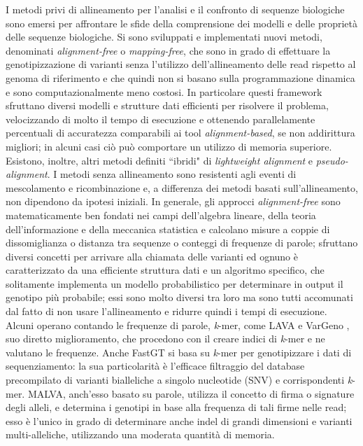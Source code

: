 \documentclass[../main.tex]{subfiles}
\begin{document}
\noindent
I metodi privi di allineamento per l'analisi e il confronto di sequenze biologiche sono emersi per affrontare le sfide della comprensione dei modelli e delle proprietà delle sequenze biologiche. Si sono sviluppati e implementati nuovi metodi, denominati \textit{alignment-free} o \textit{mapping-free}, che sono in grado di effettuare la genotipizzazione di varianti senza l'utilizzo dell'allineamento delle read rispetto al genoma di riferimento e che quindi non si basano sulla programmazione dinamica e sono computazionalmente meno costosi. In particolare questi framework sfruttano diversi modelli e strutture dati efficienti per risolvere il problema, velocizzando di molto il tempo di esecuzione e ottenendo parallelamente percentuali di accuratezza comparabili ai tool \textit{alignment-based}, se non addirittura migliori; in alcuni casi ciò può comportare un utilizzo di memoria superiore. Esistono, inoltre, altri metodi definiti ``ibridi" di \textit{lightweight alignment} e \textit{pseudo-alignment}. 
I metodi senza allineamento sono resistenti agli eventi di mescolamento e ricombinazione e, a differenza dei metodi basati sull'allineamento, non dipendono da ipotesi iniziali. In generale, gli approcci \textit{alignment-free} sono matematicamente ben fondati nei campi dell'algebra lineare, della teoria dell'informazione e della meccanica statistica e calcolano misure a coppie di dissomiglianza o distanza tra sequenze o conteggi di frequenze di parole; sfruttano diversi concetti per arrivare alla chiamata delle varianti ed ognuno è caratterizzato da una efficiente struttura dati e un algoritmo specifico, che solitamente implementa un modello probabilistico per determinare in output il genotipo più probabile; essi sono molto diversi tra loro ma sono tutti accomunati dal fatto di non usare l'allineamento e ridurre quindi i tempi di esecuzione. Alcuni operano contando le frequenze di parole, \textit{k}-mer, come LAVA \cite{shajii2016lava} e VarGeno \cite{sun-medvedev2018vargeno}, suo diretto miglioramento, che procedono con il creare indici di \textit{k}-mer e ne valutano le frequenze. Anche FastGT \cite{pajuste2017fastgt} si basa su \textit{k}-mer per genotipizzare i dati di sequenziamento: la sua particolarità è l'efficace filtraggio del database precompilato di varianti bialleliche a singolo nucleotide (SNV) e corrispondenti \textit{k}-mer. MALVA, anch'esso basato su parole, utilizza il concetto di firma o signature degli alleli, e determina i genotipi in base alla frequenza di tali firme nelle read; esso è l'unico in grado di determinare anche indel di grandi dimensioni e varianti multi-alleliche, utilizzando una moderata quantità di memoria.
\end{document}
